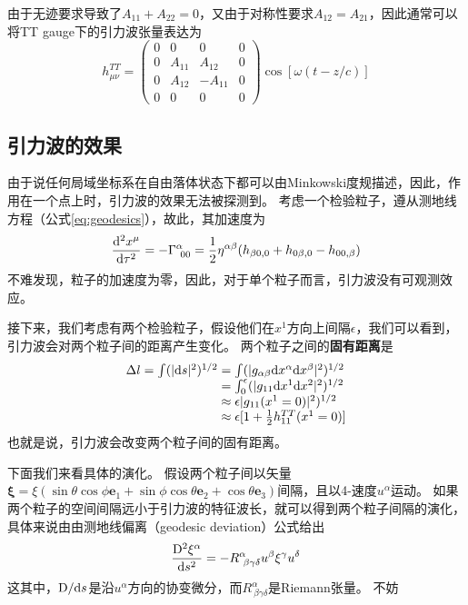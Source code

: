 由于无迹要求导致了$A_{11}+A_{22} = 0$，又由于对称性要求$A_{12}=A_{21}$，因此通常可以将TT gauge下的引力波张量表达为
\begin{equation}\label{eq:TT_hmunu}
  h_{\mu\nu}^{TT} ={\begin{pmatrix}
    0 & 0 & 0 & 0\\
    0 & A_{11} & A_{12} & 0\\ 
    0 & A_{12} & -A_{11} & 0\\
  0 & 0 & 0 & 0\end{pmatrix}}  \cos\left[ \omega (t-z/c)\right]
\end{equation}

\subsection{引力波的效果}
由于\GR 说任何局域坐标系在自由落体状态下都可以由Minkowski度规描述，因此，作用在一个点上时，引力波的效果无法被探测到。
考虑一个检验粒子，遵从测地线方程（公式\ref{eq:geodesics}），故此，其加速度为
\begin{equation}\label{eq:GWparticle} 
  \frac{{\rm d}^2 x^\mu}{{\rm d}\tau^2} = -\Gamma ^{\alpha} _{~00} = \frac{1}{2}\eta^{\alpha\beta}(h_{\beta 0,0}+h_{0\beta ,0}-h_{00,\beta })
\end{equation}
不难发现，粒子的加速度为零，因此，对于单个粒子而言，引力波没有可观测效应。

接下来，我们考虑有两个检验粒子，假设他们在$x^1$方向上间隔$\epsilon$，我们可以看到，引力波会对两个粒子间的距离产生变化。
两个粒子之间的{\textbf{固有距离}}是
\begin{equation}\label{eq:PropDis2part} 
\begin{array}{r@{}l}
  \Delta l = \int (|{\rm d}s|^2) ^{1/2} &{}= \int (| g_{\alpha\beta}{\rm d}x^\alpha {\rm d}x^\beta|^2) ^{1/2} \\
&{}=\int_0^\epsilon  (| g_{11}{\rm d}x^1 {\rm d}x^2|^2) ^{1/2} \\
  &{}\approx \epsilon  | g_{11}(x^1=0)|^2) ^{1/2} \\
  &{}\approx \epsilon  [1+ \frac{1}{2} h_{11}^{TT}(x^1=0)]
\end{array}
\end{equation}
也就是说，引力波会改变两个粒子间的固有距离。

下面我们来看具体的演化。
假设两个粒子间以矢量 $\mathbf{\xi} = \xi(\sin\theta \cos \phi \mathbf{e}_1+\sin\phi\cos \theta  \mathbf{e}_2+\cos \theta  \mathbf{e}_3)$间隔，且以4-速度$u^\alpha$运动。
如果两个粒子的空间间隔远小于引力波的特征波长，就可以得到两个粒子间隔的演化，具体来说由由测地线偏离（geodesic deviation）公式给出
\begin{equation}\label{eq:GW2particle} 
  \frac{{\rm D}^2 \xi^\alpha}{{\rm d}s^2} = -R ^{\alpha} _{~\beta\gamma\delta} u^{\beta} \xi^\gamma u^\delta
\end{equation}
这其中，${\rm D}/{\rm d}s$是沿$u^\alpha$方向的协变微分，而$R ^{\alpha} _{~\beta\gamma\delta}$是Riemann张量。
不妨
